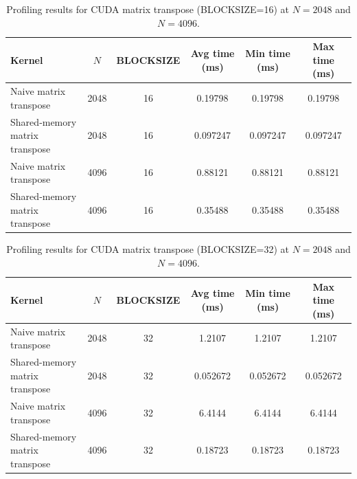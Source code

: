 \documentclass[11pt]{article}
\begin{document}
\begin{table}[H]
\centering
\begin{tabular}{|l|c|c|c|c|c|}
\hline
\textbf{Kernel}                             & \boldmath$N$\unboldmath & \textbf{BLOCKSIZE} & \textbf{Avg time (ms)} & \textbf{Min time (ms)} & \textbf{Max time (ms)} \\ \hline
Naive matrix transpose                      & 2048  & 16  & 0.19798  & 0.19798  & 0.19798  \\
Shared‐memory matrix transpose              & 2048  & 16  & 0.097247 & 0.097247 & 0.097247 \\ \hline
Naive matrix transpose                      & 4096  & 16  & 0.88121  & 0.88121  & 0.88121  \\
Shared‐memory matrix transpose              & 4096  & 16  & 0.35488  & 0.35488  & 0.35488  \\ \hline
\end{tabular}
\caption{Profiling results for CUDA matrix transpose (BLOCKSIZE=16) at $N=2048$ and $N=4096$.}
\label{tab:matTranspose_combined_updated}
\end{table}

\begin{table}[H]
\centering
\begin{tabular}{|l|c|c|c|c|c|}
\hline
\textbf{Kernel}                             & \boldmath$N$\unboldmath & \textbf{BLOCKSIZE} & \textbf{Avg time (ms)} & \textbf{Min time (ms)} & \textbf{Max time (ms)} \\ \hline
Naive matrix transpose                      & 2048  & 32  & 1.2107   & 1.2107   & 1.2107   \\
Shared-memory matrix transpose              & 2048  & 32  & 0.052672 & 0.052672 & 0.052672 \\ \hline
Naive matrix transpose                      & 4096  & 32  & 6.4144   & 6.4144   & 6.4144   \\
Shared-memory matrix transpose              & 4096  & 32  & 0.18723  & 0.18723  & 0.18723  \\ \hline
\end{tabular}
\caption{Profiling results for CUDA matrix transpose (BLOCKSIZE=32) at $N=2048$ and $N=4096$.}
\label{tab:matTranspose_combined_updated}
\end{table}
\end{document}
